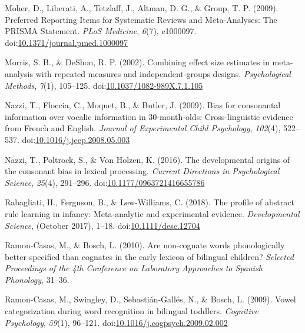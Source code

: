 \documentclass[man, noextraspace]{apa6}
\begin{document}
\leavevmode\hypertarget{ref-Moher2009}{}%
Moher, D., Liberati, A., Tetzlaff, J., Altman, D. G., \& Group, T. P. (2009). Preferred Reporting Items for Systematic Reviews and Meta-Analyses: The PRISMA Statement. \emph{PLoS Medicine}, \emph{6}(7), e1000097. doi:\href{https://doi.org/10.1371/journal.pmed.1000097}{10.1371/journal.pmed.1000097}

\leavevmode\hypertarget{ref-morris2002combining}{}%
Morris, S. B., \& DeShon, R. P. (2002). Combining effect size estimates in meta-analysis with repeated measures and independent-groups designs. \emph{Psychological Methods}, \emph{7}(1), 105--125. doi:\href{https://doi.org/10.1037/1082-989X.7.1.105}{10.1037/1082-989X.7.1.105}

\leavevmode\hypertarget{ref-Nazzi2009a}{}%
Nazzi, T., Floccia, C., Moquet, B., \& Butler, J. (2009). Bias for consonantal information over vocalic information in 30-month-olds: Cross-linguistic evidence from French and English. \emph{Journal of Experimental Child Psychology}, \emph{102}(4), 522--537. doi:\href{https://doi.org/10.1016/j.jecp.2008.05.003}{10.1016/j.jecp.2008.05.003}

\leavevmode\hypertarget{ref-Nazzi2016}{}%
Nazzi, T., Poltrock, S., \& Von Holzen, K. (2016). The developmental origins of the consonant bias in lexical processing. \emph{Current Directions in Psychological Science}, \emph{25}(4), 291--296. doi:\href{https://doi.org/10.1177/0963721416655786}{10.1177/0963721416655786}

\leavevmode\hypertarget{ref-Rabagliati2018}{}%
Rabagliati, H., Ferguson, B., \& Lew-Williams, C. (2018). The profile of abstract rule learning in infancy: Meta-analytic and experimental evidence. \emph{Developmental Science}, (October 2017), 1--18. doi:\href{https://doi.org/10.1111/desc.12704}{10.1111/desc.12704}

\leavevmode\hypertarget{ref-Ramon-Casas2010}{}%
Ramon-Casas, M., \& Bosch, L. (2010). Are non-cognate words phonologically better specified than cognates in the early lexicon of bilingual children? \emph{Selected Proceedings of the 4th Conference on Laboratory Approaches to Spanish Phonology}, 31--36.

\leavevmode\hypertarget{ref-Ramon-Casas2009}{}%
Ramon-Casas, M., Swingley, D., Sebastián-Gallés, N., \& Bosch, L. (2009). Vowel categorization during word recognition in bilingual toddlers. \emph{Cognitive Psychology}, \emph{59}(1), 96--121. doi:\href{https://doi.org/10.1016/j.cogpsych.2009.02.002}{10.1016/j.cogpsych.2009.02.002}
\end{document}
